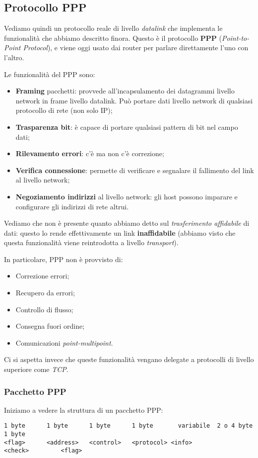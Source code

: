 \documentclass[a4paper,11pt]{article}
\begin{document}
\subsection{Protocollo PPP}
Vediamo quindi un protocollo reale di livello \textit{datalink} che implementa le funzionalità che abbiamo descritto finora.
Questo è il protocollo \textbf{PPP} (\textit{Point-to-Point Protocol}), e viene oggi usato dai router per parlare direttamente l'uno con l'altro.

Le funzionalità del PPP sono:
\begin{itemize}
	\item \textbf{Framing} pacchetti: provvede all'incapsulamento dei datagrammi livello network in frame livello datalink. Può portare dati livello network di qualsiasi protocollo di rete (non solo IP);
	\item \textbf{Trasparenza bit}: è capace di portare qualsiasi pattern di bit nel campo dati;
	\item \textbf{Rilevamento errori}: c'è ma non c'è correzione;
	\item \textbf{Verifica connessione}: permette di verificare e segnalare il fallimento del link al livello network;
	\item \textbf{Negoziamento indirizzi} al livello network: gli host possono imparare e configurare gli indirizzi di rete altrui.
\end{itemize}

Vediamo che non è presente quanto abbiamo detto sul \textit{trasferimento affidabile} di dati: questo lo rende effettivamente un link \textbf{inaffidabile} (abbiamo visto che questa funzionalità viene reintrodotta a livello \textit{transport}).

In particolare, PPP non è provvisto di:
\begin{itemize}
	\item Correzione errori;
	\item Recupero da errori;
	\item Controllo di flusso;
	\item Consegna fuori ordine;
	\item Comunicazioni \textit{point-multipoint}. 
\end{itemize}

Ci si aspetta invece che queste funzionalità vengano delegate a protocolli di livello superiore come \textit{TCP}.

\subsubsection{Pacchetto PPP}
Iniziamo a vedere la struttura di un pacchetto PPP:
\begin{lstlisting}[style=codestyle]	
1 byte		1 byte		1 byte		1 byte		 variabile	2 o 4 byte	1 byte
<flag>		<address>	<control>	<protocol> <info>			<check>			<flag>
\end{lstlisting}
\end{document}
